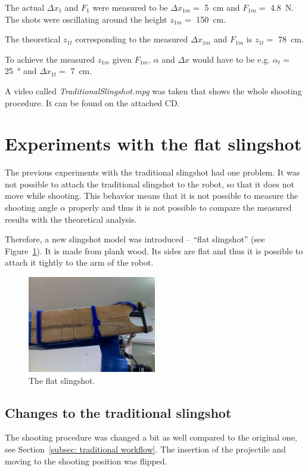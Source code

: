 			The actual $ \Delta x_1$ and $F_1$  were measured to be $\Delta x_{1m} = $ \SI{5}{cm} and $F_{1m} = $ \SI{4.8}{N}. The shots were oscillating around the height $z_{1m} =$ \SI{150}{cm}.
			
			The theoretical $z_{1t}$ corresponding to the measured $\Delta x_{1m}$ and $F_{1m}$ is $z_{1t} = $ \SI{78}{cm}.
			
			To achieve the measured $z_{1m}$ given $F_{1m}$, $ \alpha$ and $\Delta x$ would have to be e.g. $\alpha_t = $ \SI{25}{\degree} and $\Delta x_{1t} = $ \SI{7}{cm}.
			
			A video called \textit{TraditionalSlingshot.mpg} was taken that shows the whole shooting procedure. It can be found on the attached CD.

	
	\section{Experiments with the flat slingshot}
		The previous experiments with the traditional slingshot had one problem. It was not possible to attach the traditional slingshot to the robot, so that it does not move while shooting. This behavior means that it is not possible to measure the shooting angle $\alpha$ properly and thus it is not possible to compare the measured results with the theoretical analysis.

		Therefore, a new slingshot model was introduced -- ``flat slingshot'' (see Figure~\ref{fig:flat slingshot}). It is made from plank wood. Its sides are flat and thus it is possible to attach it tightly to the arm of the robot.

		\begin{figure}
		\includegraphics[width=0.5\textwidth]{attached_flat_slingshot.png}			
		\centering
		\caption{The flat slingshot.}
		\label{fig:flat slingshot}
		\end{figure}

		\subsection{Changes to the traditional slingshot}
			The shooting procedure was changed a bit as well compared to the original one, see Section~\ref{subsec: traditional workflow}. The insertion of the projectile and moving to the shooting position was flipped.

